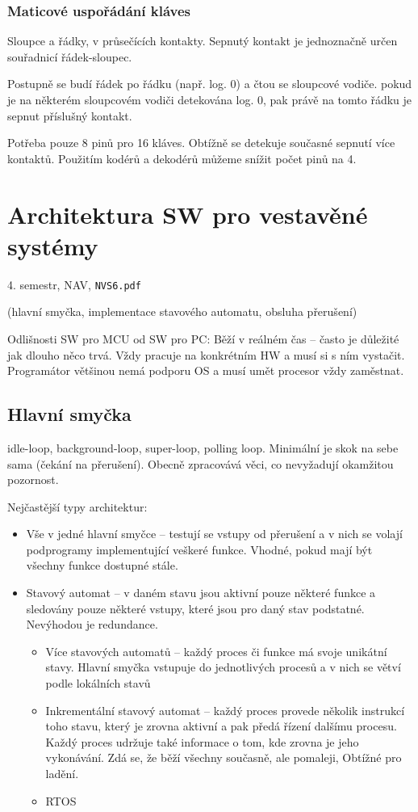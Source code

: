 \documentclass[a4paper, 11pt]{report}
\begin{document}
\subsection{Maticové uspořádání kláves}
Sloupce a řádky, v průsečících kontakty. Sepnutý kontakt je jednoznačně určen souřadnicí řádek-sloupec.

Postupně se budí řádek po řádku (např. log. 0) a čtou se sloupcové vodiče. pokud je na některém sloupcovém vodiči detekována log. 0, pak právě na tomto řádku je sepnut příslušný kontakt.

Potřeba pouze 8 pinů pro 16 kláves. Obtížně se detekuje současné sepnutí více kontaktů. Použitím kodérů a dekodérů můžeme snížit počet pinů na 4.

\chapter{Architektura SW pro vestavěné systémy} \label{cha:61}
4. semestr, NAV, \texttt{NVS6.pdf}

(hlavní smyčka, implementace stavového automatu, obsluha přerušení)

Odlišnosti SW pro MCU od SW pro PC: Běží v reálném čas -- často je důležité jak dlouho něco trvá. Vždy pracuje na konkrétním HW a musí si s ním vystačit. Programátor většinou nemá podporu OS a musí umět procesor vždy zaměstnat.

\section{Hlavní smyčka}
idle-loop, background-loop, super-loop, polling loop. Minimální je skok na sebe sama (čekání na přerušení). Obecně zpracovává věci, co nevyžadují okamžitou pozornost.

Nejčastější typy architektur:
\begin{itemize}
	\item Vše v jedné hlavní smyčce -- testují se vstupy od přerušení a v nich se volají podprogramy implementující veškeré funkce. Vhodné, pokud mají být všechny funkce dostupné stále.
	\item Stavový automat -- v daném stavu jsou aktivní pouze některé funkce a sledovány pouze některé vstupy, které jsou pro daný stav podstatné. Nevýhodou je redundance.
	\begin{itemize}
		\item Více stavových automatů -- každý proces či funkce má svoje unikátní stavy. Hlavní smyčka vstupuje do jednotlivých procesů a v nich se větví podle lokálních stavů
		\item Inkrementální stavový automat -- každý proces provede několik instrukcí toho stavu, který je zrovna aktivní a pak předá řízení dalšímu procesu. Každý proces udržuje také informace o tom, kde zrovna je jeho vykonávání. Zdá se, že běží všechny současně, ale pomaleji, Obtížné pro ladění.
		\item RTOS
	\end{itemize}
\end{itemize}
\end{document}

